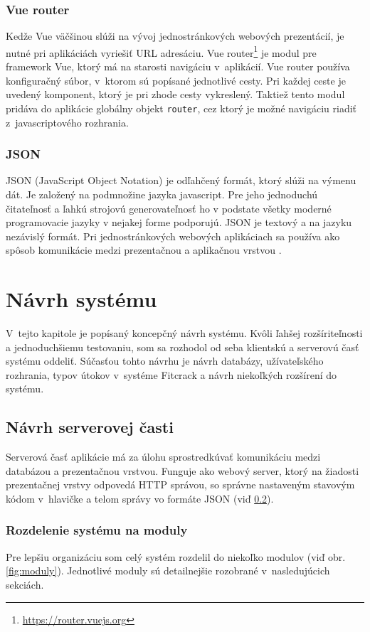 \documentclass[zadani,slovak]{fitthesis}
\begin{document}
\subsection{Vue router}\label{vueRouter}
Kedže Vue väčšinou slúži na vývoj jednostránkových webových prezentácií, je nutné pri aplikáciách vyriešiť URL adresáciu. Vue router\footnote{\url{https://router.vuejs.org}} je modul pre framework Vue, ktorý má na starosti navigáciu v~aplikácií. Vue router používa konfiguračný súbor, v~ktorom sú popísané jednotlivé cesty. Pri každej ceste je uvedený komponent, ktorý je pri zhode cesty vykreslený. Taktiež tento modul pridáva do aplikácie globálny objekt \texttt{router}, cez ktorý je možné navigáciu riadiť z~javascriptového rozhrania.


\subsection{JSON}\label{json}
JSON (JavaScript Object Notation) je odľahčený formát, ktorý slúži na výmenu dát. Je založený na podmnožine jazyka javascript. Pre jeho jednoduchú čitateľnosť a ľahkú strojovú generovateľnosť ho v podstate všetky moderné programovacie jazyky v nejakej forme podporujú. JSON je textový a na jazyku nezávislý formát. Pri jednostránkových webových aplikáciach sa používa ako spôsob komunikácie medzi prezentačnou a aplikačnou vrstvou \cite{JSONrfc}.


\chapter{Návrh systému}\label{navrh}
V~tejto kapitole je popísaný koncepčný návrh systému. Kvôli ľahšej rozšíriteľnosti a jednoduchšiemu testovaniu, som sa rozhodol od seba klientskú a serverovú časť systému oddeliť. Súčasťou tohto návrhu je  návrh databázy, užívateľského rozhrania, typov útokov v~systéme Fitcrack a návrh niekoľkých rozšírení do systému. 

\section{Návrh serverovej časti}\label{navrhServer}
Serverová časť aplikácie má za úlohu sprostredkúvať komunikáciu medzi databázou a prezentačnou vrstvou. Funguje ako webový server, ktorý na žiadosti prezentačnej vrstvy odpovedá HTTP správou, so správne nastaveným stavovým kódom v~hlavičke a telom správy vo formáte JSON (viď \ref{json}).

\subsection{Rozdelenie systému na moduly}
Pre lepšiu organizáciu som celý systém rozdelil do niekoľko modulov (viď obr. \ref{fig:moduly}). Jednotlivé moduly sú detailnejšie rozobrané v~nasledujúcich sekciách. 
\end{document}
